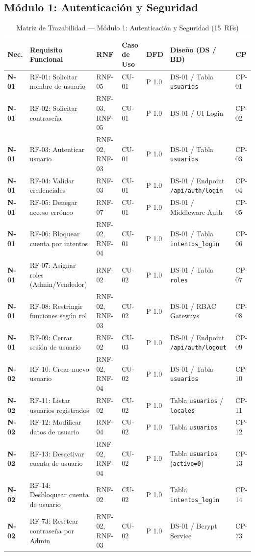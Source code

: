 \subsection{M\'odulo 1: Autenticaci\'on y Seguridad}
\begin{table}[H]
\centering\scriptsize
\begin{tabularx}{\textwidth}{>{\centering\bfseries}p{1.2cm} Y >{\centering\arraybackslash}p{2.0cm} >{\centering\arraybackslash}p{1.5cm} >{\centering\arraybackslash}p{1.0cm} >{\raggedright\arraybackslash}p{3.0cm} >{\centering\arraybackslash}p{1.2cm}}
\toprule
\textbf{Nec.} & \textbf{Requisito Funcional} & \textbf{RNF} & \textbf{Caso de Uso} & \textbf{DFD} & \textbf{Dise\~no (DS / BD)} & \textbf{CP} \\
\midrule
N-01 & RF-01: Solicitar nombre de usuario & RNF-05 & CU-01 & P 1.0 & DS-01 / Tabla \texttt{usuarios} & CP-01 \\
N-01 & RF-02: Solicitar contrase\~na & RNF-03, RNF-05 & CU-01 & P 1.0 & DS-01 / UI-Login & CP-02 \\
N-01 & RF-03: Autenticar usuario & RNF-02, RNF-03 & CU-01 & P 1.0 & DS-01 / Tabla \texttt{usuarios} & CP-03 \\
N-01 & RF-04: Validar credenciales & RNF-03 & CU-01 & P 1.0 & DS-01 / Endpoint \texttt{/api/auth/login} & CP-04 \\
N-01 & RF-05: Denegar acceso err\'oneo & RNF-07 & CU-01 & P 1.0 & DS-01 / Middleware Auth & CP-05 \\
N-01 & RF-06: Bloquear cuenta por intentos & RNF-02, RNF-04 & CU-01 & P 1.0 & DS-01 / Tabla \texttt{intentos\_login} & CP-06 \\
N-01 & RF-07: Asignar roles (Admin/Vendedor) & RNF-02 & CU-02 & P 1.0 & DS-01 / Tabla \texttt{roles} & CP-07 \\
N-01 & RF-08: Restringir funciones seg\'un rol & RNF-02, RNF-03 & CU-02 & P 1.0 & DS-01 / RBAC Gateways & CP-08 \\
N-01 & RF-09: Cerrar sesi\'on de usuario & RNF-02 & CU-03 & P 1.0 & DS-01 / Endpoint \texttt{/api/auth/logout} & CP-09 \\
N-02 & RF-10: Crear nuevo usuario & RNF-02, RNF-04 & CU-02 & P 1.0 & DS-01 / Tabla \texttt{usuarios} & CP-10 \\
N-02 & RF-11: Listar usuarios registrados & RNF-02 & CU-02 & P 1.0 & Tabla \texttt{usuarios} / \texttt{locales} & CP-11 \\
N-02 & RF-12: Modificar datos de usuario & RNF-04 & CU-02 & P 1.0 & Tabla \texttt{usuarios} & CP-12 \\
N-02 & RF-13: Desactivar cuenta de usuario & RNF-02, RNF-04 & CU-02 & P 1.0 & Tabla \texttt{usuarios} (\texttt{activo=0}) & CP-13 \\
N-02 & RF-14: Desbloquear cuenta de usuario & RNF-02 & CU-02 & P 1.0 & Tabla \texttt{intentos\_login} & CP-14 \\
N-02 & RF-73: Resetear contrase\~na por Admin & RNF-02, RNF-03 & CU-02 & P 1.0 & DS-01 / Bcrypt Service & CP-73 \\
\bottomrule
\end{tabularx}
\caption{Matriz de Trazabilidad --- M\'odulo 1: Autenticaci\'on y Seguridad (15~RFs)}
\label{tab:trazabilidad_modulo1}
\end{table}

